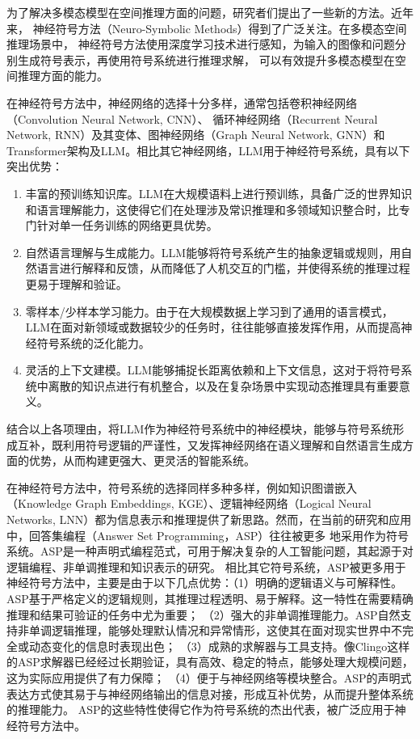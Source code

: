 为了解决多模态模型在空间推理方面的问题，研究者们提出了一些新的方法。近年来，
神经符号方法（Neuro-Symbolic Methods）得到了广泛关注。在多模态空间推理场景中，
神经符号方法使用深度学习技术进行感知，为输入的图像和问题分别生成符号表示，再使用符号系统进行推理求解，
可以有效提升多模态模型在空间推理方面的能力。

在神经符号方法中，神经网络的选择十分多样，通常包括卷积神经网络（Convolution Neural Network, CNN）、
循环神经网络（Recurrent Neural Network, RNN）及其变体、图神经网络（Graph Neural Network, GNN）和
Transformer架构及LLM。相比其它神经网络，LLM用于神经符号系统，具有以下突出优势：
\begin{enumerate}[itemsep=0pt,parsep=0pt]
    \item 丰富的预训练知识库。LLM在大规模语料上进行预训练，具备广泛的世界知识和语言理解能力，这使得它们在处理涉及常识推理和多领域知识整合时，比专门针对单一任务训练的网络更具优势。
    \item 自然语言理解与生成能力。LLM能够将符号系统产生的抽象逻辑或规则，用自然语言进行解释和反馈，从而降低了人机交互的门槛，并使得系统的推理过程更易于理解和验证。
    \item 零样本/少样本学习能力。由于在大规模数据上学习到了通用的语言模式，LLM在面对新领域或数据较少的任务时，往往能够直接发挥作用，从而提高神经符号系统的泛化能力。
    \item 灵活的上下文建模。LLM能够捕捉长距离依赖和上下文信息，这对于将符号系统中离散的知识点进行有机整合，以及在复杂场景中实现动态推理具有重要意义。
\end{enumerate}
结合以上各项理由，将LLM作为神经符号系统中的神经模块，能够与符号系统形成互补，既利用符号逻辑的严谨性，又发挥神经网络在语义理解和自然语言生成方面的优势，从而构建更强大、更灵活的智能系统。

在神经符号方法中，符号系统的选择同样多种多样，例如知识图谱嵌入（Knowledge Graph Embeddings, KGE）、逻辑神经网络（Logical
 Neural Networks, LNN）都为信息表示和推理提供了新思路。然而，在当前的研究和应用中，回答集编程（Answer Set Programming，ASP）往往被更多
地采用作为符号系统。ASP是一种声明式编程范式，可用于解决复杂的人工智能问题，其起源于对逻辑编程、非单调推理和知识表示的研究。
相比其它符号系统，ASP被更多用于神经符号方法中，主要是由于以下几点优势：（1）明确的逻辑语义与可解释性。ASP基于严格定义的逻辑规则，其推理过程透明、易于解释。这一特性在需要精确推理和结果可验证的任务中尤为重要\cite{gelfond1988stable}；
（2）强大的非单调推理能力。ASP自然支持非单调逻辑推理，能够处理默认情况和异常情形，这使其在面对现实世界中不完全或动态变化的信息时表现出色\cite{gelfond1988stable}；
（3）成熟的求解器与工具支持。像Clingo这样的ASP求解器已经经过长期验证，具有高效、稳定的特点，能够处理大规模问题，这为实际应用提供了有力保障\cite{gebser2012answer}；
（4）便于与神经网络等模块整合。ASP的声明式表达方式使其易于与神经网络输出的信息对接，形成互补优势，从而提升整体系统的推理能力\cite{garcez2002neural}。
ASP的这些特性使得它作为符号系统的杰出代表，被广泛应用于神经符号方法中。

